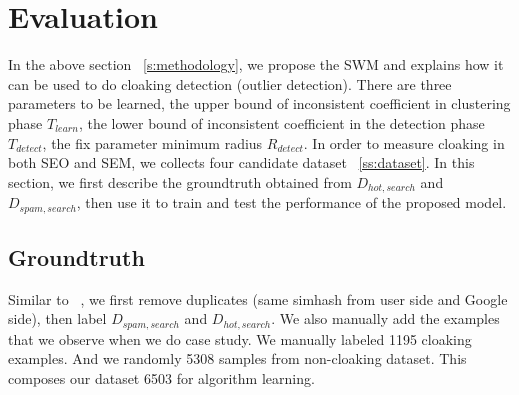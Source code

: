 \section{Evaluation}
\label{s:evaluation}



In the above section ~\autoref{s:methodology}, we propose the SWM and explains
how it can be used to do cloaking detection (outlier detection). There are three
parameters to be learned, the upper bound of inconsistent coefficient in
clustering phase $T_{learn}$, the lower bound of inconsistent coefficient in the detection
phase $T_{detect}$, the fix parameter minimum radius $R_{detect}$. 
In order to measure cloaking in both SEO and SEM, we collects four candidate dataset
~\autoref{ss:dataset}. In this section,
we first describe the groundtruth obtained from $D_{hot, search}$ and $D_{spam,
search}$, then use it to train and test the performance of the proposed model.

\subsection{Groundtruth}

Similar to ~\cite{lin2009detection}, we first remove duplicates (same simhash
from user side and Google side), then label $D_{spam, search}$ and $D_{hot,
search}$. We also manually add the examples that we observe when we do case
study. We manually labeled 1195 cloaking examples. And we randomly
 5308 samples from non-cloaking dataset. This composes our
dataset 6503 for algorithm learning.

%
%
%
%



